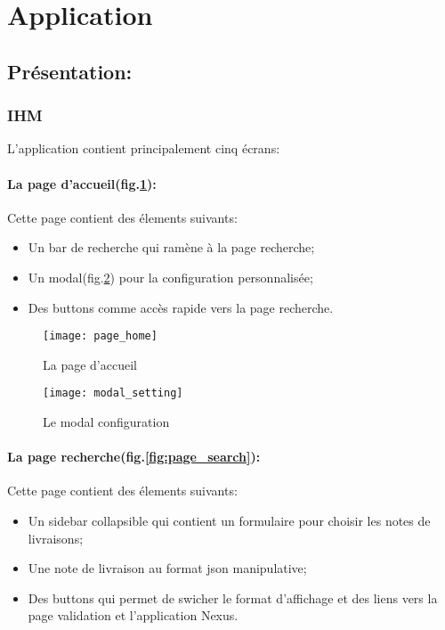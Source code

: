 \section{Application}
\subsection{Présentation:}

\subsubsection{IHM}
L'application contient principalement cinq écrans:
\paragraph{La page d'accueil(fig.\ref{fig:page_home}): } Cette page contient des élements suivants:
\begin{itemize}
  \item Un bar de recherche qui ramène à la page recherche;
  \item Un modal(fig.\ref{fig:modal_setting}) pour la configuration personnalisée;
  \item Des buttons comme accès rapide vers la page recherche.
\end{itemize}

\begin{figure}[h]
\centering
\texttt{[image: page\_home]}
\caption{La page d'accueil}
\label{fig:page_home}
\end{figure}

\begin{figure}[h]
\centering
\texttt{[image: modal\_setting]}
\caption{Le modal configuration}
\label{fig:modal_setting}
\end{figure}

\paragraph{La page recherche(fig.\ref{fig:page_search}): } Cette page contient des élements suivants:
\begin{itemize}
  \item Un sidebar collapsible qui contient un formulaire pour choisir les notes de livraisons;
  \item Une note de livraison au format json manipulative;
  \item Des buttons qui permet de swicher le format d'affichage et des liens vers la page validation et l'application Nexus.
\end{itemize}

